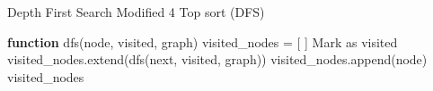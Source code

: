 \documentclass[12pt]{extarticle}
\begin{document}
\begin{algorithm} [H]
    \caption{Depth First Search Modified 4 Top sort (DFS)}
    \begin{algorithmic}[1]
        \STATE \textbf{function} dfs(node, visited, graph)
        \STATE visited\_nodes = [ ]
        \RETURN
        \ENDIF
        \STATE Mark as visited
        \STATE visited\_nodes.extend(dfs(next, visited, graph))
        \ENDFOR
        \STATE visited\_nodes.append(node)
        \RETURN visited\_nodes
    \end{algorithmic}
\end{algorithm}
\end{document}

